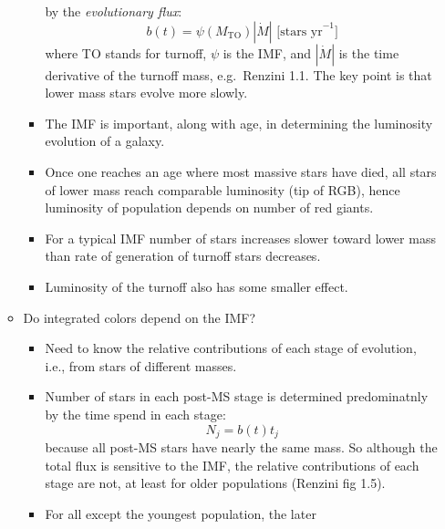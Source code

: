\documentclass{article}
\begin{document}
\begin{itemize}
\begin{itemize}
\begin{itemize}
                            by the \emph{evolutionary flux}:
                            $$ b(t) = \psi(M_{\textrm{TO}})|\dot{M}|
                            \textrm{\ [stars\ yr}^{-1}]$$
                            where TO stands for turnoff, $\psi$ is the IMF,
                            and $|\dot{M}|$ is the time derivative of the
                            turnoff mass, e.g.\ Renzini 1.1. The key point is
                            that lower mass stars evolve more slowly.
                        \item The IMF is important, along with age, in
                            determining the luminosity evolution of a galaxy.
                        \item Once one reaches an age where most massive stars
                            have died, all stars of lower mass reach comparable
                            luminosity (tip of RGB), hence luminosity of
                            population depends on number of red giants.
                        \item For a typical IMF number of stars increases
                            slower toward lower mass than rate of generation
                            of turnoff stars decreases.
                        \item Luminosity of the turnoff also has some smaller
                            effect.
                    \end{itemize}
                \item Do integrated colors depend on the IMF?
                    \begin{itemize}
                        \item Need to know the relative contributions of each
                            stage of evolution, i.e., from stars of different
                            masses.
                        \item Number of stars in each post-MS stage is
                            determined predominatnly by the time spend in each
                            stage:
                            $$ N_j = b(t)t_j $$
                            because all post-MS stars have nearly the same mass.
                            So although the total flux is sensitive to the IMF,
                            the relative contributions of each stage are not,
                            at least for older populations (Renzini fig 1.5).
                        \item For all except the youngest population, the later

\end{itemize}
\end{itemize}
\end{itemize}
\end{document}
